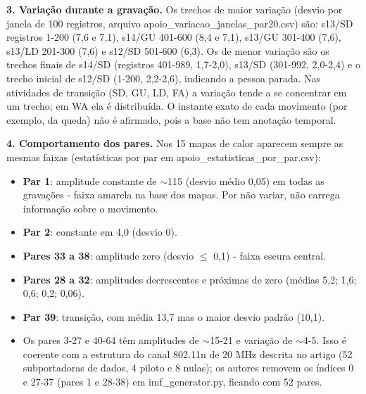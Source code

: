 \textbf{3. Variação durante a gravação.} Os trechos de maior variação (desvio por janela de 100 registros, arquivo apoio\_variacao\_janelas\_par20.csv) são: s13/SD registros 1-200 (7,6 e 7,1), s14/GU 401-600 (8,4 e 7,1), s13/GU 301-400 (7,6), s13/LD 201-300 (7,6) e s12/SD 501-600 (6,3). Os de menor variação são os trechos finais de s14/SD (registros 401-989, 1,7-2,0), s13/SD (301-992, 2,0-2,4) e o trecho inicial de s12/SD (1-200, 2,2-2,6), indicando a pessoa parada. Nas atividades de transição (SD, GU, LD, FA) a variação tende a se concentrar em um trecho; em WA ela é distribuída. O instante exato de cada movimento (por exemplo, da queda) não é afirmado, pois a base não tem anotação temporal.

\textbf{4. Comportamento dos pares.} Nos 15 mapas de calor aparecem sempre as mesmas faixas (estatísticas por par em apoio\_estatisticas\_por\_par.csv):

\begin{itemize}
    \item \textbf{Par 1}: amplitude constante de $\sim$115 (desvio médio 0,05) em todas as gravações - faixa amarela na base dos mapas. Por não variar, não carrega informação sobre o movimento.
    \item \textbf{Par 2}: constante em 4,0 (desvio 0).
    \item \textbf{Pares 33 a 38}: amplitude zero (desvio $\leq$ 0,1) - faixa escura central.
    \item \textbf{Pares 28 a 32}: amplitudes decrescentes e próximas de zero (médias 5,2; 1,6; 0,6; 0,2; 0,06).
    \item \textbf{Par 39}: transição, com média 13,7 mas o maior desvio padrão (10,1).
    \item Os pares 3-27 e 40-64 têm amplitudes de $\sim$15-21 e variação de $\sim$4-5. Isso é coerente com a estrutura do canal 802.11n de 20 MHz descrita no artigo (52 subportadoras de dados, 4 piloto e 8 nulas); os autores removem os índices 0 e 27-37 (pares 1 e 28-38) em imf\_generator.py, ficando com 52 pares.
\end{itemize}
\newpage
